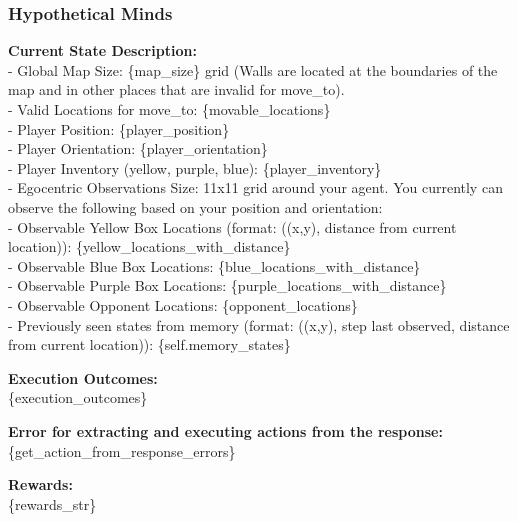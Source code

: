 \documentclass{article} %
\begin{document}
\subsubsection{Hypothetical Minds}
\begin{tcolorbox}[
    title={\small \textbf{Subgoal Module Message}},
    width=\linewidth, %
    fontupper=\fontsize{8pt}{9pt}\selectfont\ttfamily,
]
\textbf{Current State Description:}\\
- Global Map Size: \{map\_size\} grid (Walls are located at the boundaries of the map and in other places that are invalid for move\_to).\\
- Valid Locations for move\_to: \{movable\_locations\}\\
- Player Position: \{player\_position\}\\
- Player Orientation: \{player\_orientation\}\\
- Player Inventory (yellow, purple, blue): \{player\_inventory\}\\
- Egocentric Observations Size: 11x11 grid around your agent. You currently can observe the following based on your position and orientation:\\
- Observable Yellow Box Locations (format: ((x,y), distance from current location)): \{yellow\_locations\_with\_distance\}\\
- Observable Blue Box Locations: \{blue\_locations\_with\_distance\}\\
- Observable Purple Box Locations: \{purple\_locations\_with\_distance\}\\
- Observable Opponent Locations: \{opponent\_locations\}\\
- Previously seen states from memory (format: ((x,y), step last observed, distance from current location)): \{self.memory\_states\}

\textbf{Execution Outcomes:}\\
\{execution\_outcomes\}

\textbf{Error for extracting and executing actions from the response:}\\
\{get\_action\_from\_response\_errors\}

\textbf{Rewards:}\\
\{rewards\_str\}


\end{tcolorbox}
\end{document}
